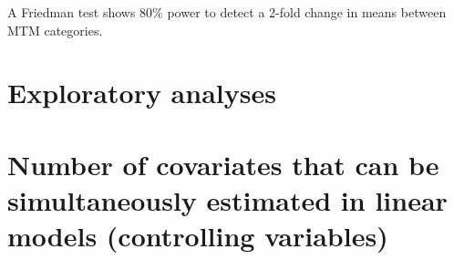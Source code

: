 \documentclass[]{article}
\begin{document}
A Friedman test shows 80\% power to detect a 2-fold change in means
between MTM categories.

\hypertarget{exploratory-analyses}{%
\section{Exploratory analyses}\label{exploratory-analyses}}

\hypertarget{number-of-covariates-that-can-be-simultaneously-estimated-in-linear-models-controlling-variables}{%
\section{Number of covariates that can be simultaneously estimated in
linear models (controlling
variables)}\label{number-of-covariates-that-can-be-simultaneously-estimated-in-linear-models-controlling-variables}}
\end{document}
